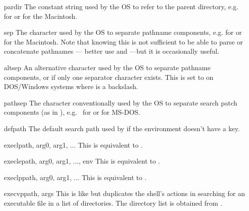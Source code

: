\begin{datadesc}{pardir}
The constant string used by the OS to refer to the parent directory,
e.g.  for \POSIX{} or  for the Macintosh.
\end{datadesc}

\begin{datadesc}{sep}
The character used by the OS to separate pathname components,
e.g.  for \POSIX{} or  for the Macintosh.  Note that
knowing this is not sufficient to be able to parse or concatenate
pathnames --- better use  and
---but it is occasionally useful.
\end{datadesc}

\begin{datadesc}{altsep}
An alternative character used by the OS to separate pathname components,
or  if only one separator character exists.  This is set to
 on DOS/Windows systems where  is a backslash.
\end{datadesc}

\begin{datadesc}{pathsep}
The character conventionally used by the OS to separate search patch
components (as in ), e.g.\  for \POSIX{} or
 for MS-DOS.
\end{datadesc}

\begin{datadesc}{defpath}
The default search path used by  if the environment
doesn't have a  key.
\end{datadesc}

\begin{funcdesc}{execl}{path, arg0, arg1, ...}
This is equivalent to
.
\end{funcdesc}

\begin{funcdesc}{execle}{path, arg0, arg1, ..., env}
This is equivalent to
.
\end{funcdesc}

\begin{funcdesc}{execlp}{path, arg0, arg1, ...}
This is equivalent to
.
\end{funcdesc}

\begin{funcdesc}{execvp}{path, args}
This is like  but duplicates
the shell's actions in searching for an executable file in a list of
directories.  The directory list is obtained from
.
\end{funcdesc}

